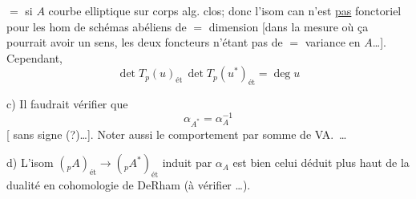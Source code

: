 $=$ si $A$ courbe elliptique sur corps alg. clos; donc l'isom can n'est \uline{pas} fonctoriel pour les hom de schémas abéliens de $=$ dimension [dans la mesure où ça pourrait avoir un sens, les deux foncteurs n'étant pas de $=$ variance en $A$\ldots]. Cependant, 
\[
\boxed{\det T_p(u)_{\text{ét}}\,\det T_p(u^*)_{\text{ét}}=\deg u}
\]

c) Il faudrait vérifier que
\[
\alpha_{A^*}=\alpha_A^{-1}
\]
[ sans signe (?)\ldots]. Noter aussi le comportement par somme de VA.\ \ldots

 d) L'isom $({}_pA)_{\text{ét}}\longrightarrow({}_pA^*)_{\text{ét}}$ induit par $\alpha_A$ est bien celui déduit plus haut de la dualité en cohomologie de DeRham (à vérifier \ldots).

